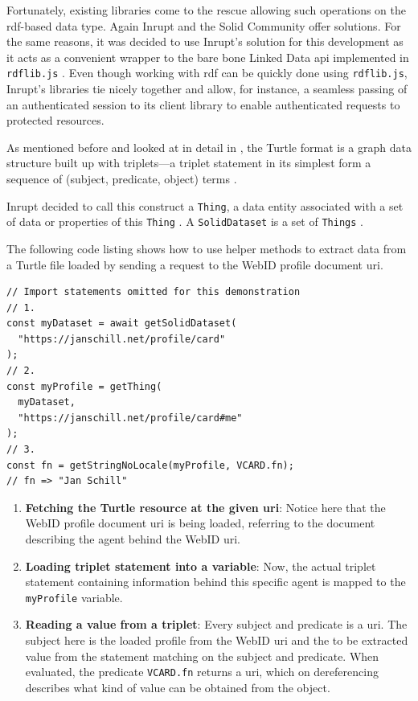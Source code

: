 Fortunately, existing libraries come to the rescue allowing such operations on the \gls{rdf}-based data type. Again Inrupt and the Solid Community offer solutions. For the same reasons, it was decided to use Inrupt's solution for this development as it acts as a convenient wrapper to the bare bone Linked Data \gls{api} implemented in \texttt{rdflib.js} \cite{rdflib-js}. Even though working with \gls{rdf} can be quickly done using \texttt{rdflib.js}, Inrupt's libraries tie nicely together and allow, for instance, a seamless passing of an authenticated session to its client library to enable authenticated requests to protected resources.

As mentioned before and looked at in detail in \cite{cern-solid-investigation-spec}, the Turtle format is a graph data structure built up with triplets---a triplet statement in its simplest form a sequence of (subject, predicate, object) terms \cite{Prud:hommeaux:14:RT}. 

Inrupt decided to call this construct a \texttt{Thing}, a data entity associated with a set of data or properties of this \texttt{Thing} \cite{inrupt-thing}. A \texttt{SolidDataset} is a set of \texttt{Things} \cite{inrupt-dataset}.

The following code listing shows how to use helper methods to extract data from a Turtle file loaded by sending a request to the WebID profile document \gls{uri}.

\begin{lstlisting}[language=Other,columns=fullflexible, caption={Basic usage of Inrupt's solid-client library.}, label={lst:2}]
// Import statements omitted for this demonstration
// 1.
const myDataset = await getSolidDataset(
  "https://janschill.net/profile/card"
);
// 2.
const myProfile = getThing(
  myDataset,
  "https://janschill.net/profile/card#me"
);
// 3.
const fn = getStringNoLocale(myProfile, VCARD.fn);
// fn => "Jan Schill"
\end{lstlisting}

\begin{enumerate}
    \item \textbf{Fetching the Turtle resource at the given \gls{uri}}: Notice here that the WebID profile document \gls{uri} is being loaded, referring to the document describing the agent behind the WebID \gls{uri}.
    \item \textbf{Loading triplet statement into a variable}: Now, the actual triplet statement containing information behind this specific agent is mapped to the \texttt{myProfile} variable.
    \item \textbf{Reading a value from a triplet}: Every subject and predicate is a \gls{uri}. The subject here is the loaded profile from the WebID \gls{uri} and the to be extracted value from the statement matching on the subject and predicate. When evaluated, the predicate \texttt{VCARD.fn} returns a \gls{uri}, which on dereferencing describes what kind of value can be obtained from the object.
\end{enumerate}


